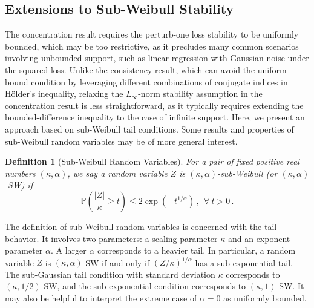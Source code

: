 \documentclass[11pt]{article}
\theoremstyle{plain}
\newtheorem{definition}[theorem]{Definition}
\begin{document}
\subsection{Extensions to Sub-Weibull Stability}\label{subsec:concentration_ineq}
The concentration result  requires the perturb-one 
loss stability to be uniformly bounded, which may be too restrictive, as it precludes 
many common scenarios involving unbounded support, such as linear regression with 
Gaussian noise under the squared loss.
Unlike the consistency result, which can avoid the uniform bound condition by leveraging 
different combinations of conjugate indices in H\"{o}lder's inequality, relaxing the 
$L_\infty$-norm stability assumption in the concentration result is less straightforward, 
as it typically requires extending the bounded-difference inequality to the case of 
infinite support.
Here, we present an approach based on sub-Weibull tail conditions. Some results and 
properties of sub-Weibull random variables may be of more general interest.


\begin{definition}[Sub-Weibull Random Variables] For a pair of fixed positive real numbers $(\kappa,\alpha)$, we say a random variable $Z$ is $(\kappa,\alpha)$-sub-Weibull (or $(\kappa,\alpha)$-SW) if
\begin{equation}\label{eq:2.5-sw-def-prob}
\mathbb P\left(\frac{|Z|}{\kappa}\ge t\right)\le 2\exp(-t^{1/\alpha})\,,~~\forall~t>0\,.
\end{equation}
\end{definition}
The definition of sub-Weibull random variables is concerned with the tail behavior. It involves two parameters: a scaling parameter $\kappa$ and an exponent parameter $\alpha$.  A larger $\alpha$ corresponds to a heavier tail. In particular, a random variable $Z$ is $(\kappa,\alpha)$-SW if and only if $(Z/\kappa)^{1/\alpha}$ has a sub-exponential tail.   The sub-Gaussian tail condition with standard deviation $\kappa$ corresponds to $(\kappa,1/2)$-SW, and the sub-exponential condition corresponds to $(\kappa,1)$-SW.   It may also be helpful to interpret the extreme case of $\alpha=0$ as uniformly bounded.
\end{document}
